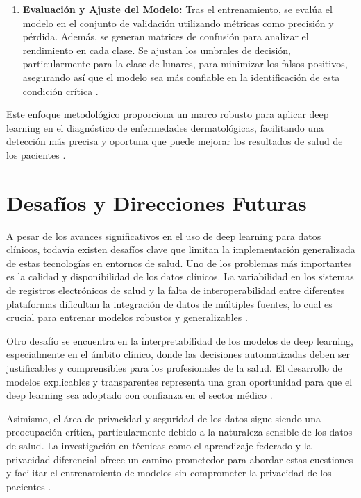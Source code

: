 \documentclass{article}
\begin{document}
\begin{enumerate}
	\item \textbf{Evaluación y Ajuste del Modelo:} Tras el entrenamiento, se evalúa el modelo en el conjunto de validación utilizando métricas como precisión y pérdida. Además, se generan matrices de confusión para analizar el rendimiento en cada clase. Se ajustan los umbrales de decisión, particularmente para la clase de lunares, para minimizar los falsos positivos, asegurando así que el modelo sea más confiable en la identificación de esta condición crítica \cite{esteva2017dermatologist}.
\end{enumerate}

Este enfoque metodológico proporciona un marco robusto para aplicar deep learning en el diagnóstico de enfermedades dermatológicas, facilitando una detección más precisa y oportuna que puede mejorar los resultados de salud de los pacientes \cite{miotto2018deep}.




\section{Desafíos y Direcciones Futuras}

A pesar de los avances significativos en el uso de deep learning para datos clínicos, todavía existen desafíos clave que limitan la implementación generalizada de estas tecnologías en entornos de salud. Uno de los problemas más importantes es la calidad y disponibilidad de los datos clínicos. La variabilidad en los sistemas de registros electrónicos de salud y la falta de interoperabilidad entre diferentes plataformas dificultan la integración de datos de múltiples fuentes, lo cual es crucial para entrenar modelos robustos y generalizables \cite{johnson2016mimic}.

Otro desafío se encuentra en la interpretabilidad de los modelos de deep learning, especialmente en el ámbito clínico, donde las decisiones automatizadas deben ser justificables y comprensibles para los profesionales de la salud. El desarrollo de modelos explicables y transparentes representa una gran oportunidad para que el deep learning sea adoptado con confianza en el sector médico \cite{holzinger2017we}.

Asimismo, el área de privacidad y seguridad de los datos sigue siendo una preocupación crítica, particularmente debido a la naturaleza sensible de los datos de salud. La investigación en técnicas como el aprendizaje federado y la privacidad diferencial ofrece un camino prometedor para abordar estas cuestiones y facilitar el entrenamiento de modelos sin comprometer la privacidad de los pacientes \cite{rieke2020future}.
\end{document}
